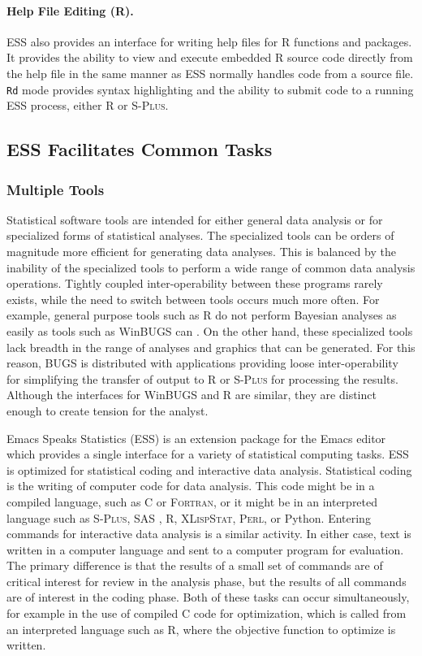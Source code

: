 \documentclass{article}
\newcommand*{\SAS}{\textsc{SAS}{\textregistered} }
\newcommand*{\Splus}{\textsc{S-Plus}}
\newcommand*{\XLispStat}{\textsc{XLispStat}}
\newcommand*{\Perl}{\textsc{Perl}}
\newcommand*{\Fortran}{\textsc{Fortran}}
\newcommand{\stexttt}[1]{{\small\texttt{#1}}}
\begin{document}
\paragraph{Help File Editing (R).}
ESS also provides an interface for writing help files for R functions
and packages.  It provides the ability to view and execute embedded R
source code directly from the help file in the same manner as ESS
normally handles code from a source file.  \stexttt{Rd} mode provides
syntax highlighting and the ability to submit code to a running ESS
process, either R or \Splus.


\subsection{ESS Facilitates Common Tasks}
\label{sec:ess-facil-comm}

\subsubsection{Multiple Tools}
\label{sec:multiple-tools}

Statistical software tools are intended for either general data
analysis or for specialized forms of statistical analyses.  The
specialized tools can be orders of magnitude more efficient for
generating data analyses.  This is balanced by the inability of the
specialized tools to perform a wide range of common data analysis
operations.  Tightly coupled inter-operability between these programs
rarely exists, while the need to switch between tools occurs much more
often.  For example, general purpose tools such as R
\citep{ihak:gent:1996} do not perform Bayesian analyses as easily as
tools such as WinBUGS can \citep{SpieThomBest:1999}.  On the other
hand, these specialized tools lack breadth in the range of analyses
and graphics that can be generated.  For this reason, BUGS is
distributed with applications providing loose inter-operability for
simplifying the transfer of output to R or \Splus{} for processing the
results.  Although the interfaces for WinBUGS and R are similar, they
are distinct enough to create tension for the analyst.

Emacs Speaks Statistics (ESS) \citep{ESS} is an extension package for
the Emacs editor which provides a single interface for a variety of
statistical computing tasks.  ESS is optimized for statistical coding
and interactive data analysis.  Statistical coding is the writing of
computer code for data analysis.  This code might be in a compiled
language, such as C or \Fortran, or it might be in an interpreted
language such as \Splus, \SAS, R, \XLispStat, \Perl, or Python.
Entering commands for interactive data analysis is a similar activity.
In either case, text is written in a computer language and sent to a
computer program for evaluation.  The primary difference is that the
results of a small set of commands are of critical interest for review
in the analysis phase, but the results of all commands are of interest
in the coding phase.  Both of these tasks can occur simultaneously,
for example in the use of compiled C code for optimization, which is
called from an interpreted language such as R, where the objective
function to optimize is written.
\end{document}
